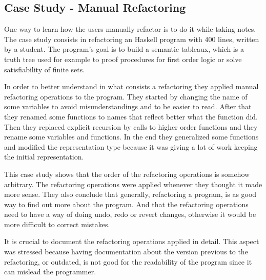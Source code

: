 \subsection{Case Study - Manual Refactoring}

One way to learn how the users manually refactor is to do it while taking notes.
The case study \cite{thompson2003case} consists in refactoring an Haskell program with 400 lines, written by a student.
The program's goal is to build a semantic tableaux, which is a truth tree used for example to proof procedures for first order logic or solve satisfiability of finite sets.

In order to better understand in what consists a refactoring they applied manual refactoring operations to the program.
They started by changing the name of some variables to avoid misunderstandings and to be easier to read.
After that they renamed some functions to names that reflect better what the function did. 
Then they replaced explicit recursion by calls to higher order functions and they rename some variables and functions.
In the end they generalized some functions and modified the representation type because it was giving a lot of work keeping the initial representation.

This case study shows that the order of the refactoring operations is somehow arbitrary.
The refactoring operations were applied whenever they thought it made more sense.
They also conclude that generally, refactoring a program, is as good way to find out more about the program. 
And that the refactoring operations need to have a way of doing undo, redo or revert changes, otherwise it would be more difficult to correct mistakes.

It is crucial to document the refactoring operations applied in detail. 
This aspect was stressed because having documentation about the version previous to the refactoring, or outdated, is not good for the readability of the program since it can mislead the programmer.


